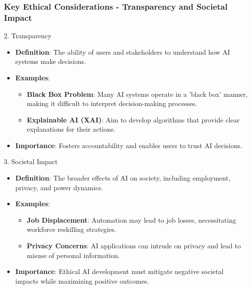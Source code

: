 \documentclass{beamer}
\begin{document}
\begin{frame}[fragile]
    \frametitle{Key Ethical Considerations - Transparency and Societal Impact}
    \begin{block}{2. Transparency}
        \begin{itemize}
            \item \textbf{Definition}: The ability of users and stakeholders to understand how AI systems make decisions.
            \item \textbf{Examples}:
            \begin{itemize}
                \item \textbf{Black Box Problem}: Many AI systems operate in a 'black box' manner, making it difficult to interpret decision-making processes.
                \item \textbf{Explainable AI (XAI)}: Aim to develop algorithms that provide clear explanations for their actions.
            \end{itemize}
            \item \textbf{Importance}: Fosters accountability and enables users to trust AI decisions.
        \end{itemize}
    \end{block}
    \begin{block}{3. Societal Impact}
        \begin{itemize}
            \item \textbf{Definition}: The broader effects of AI on society, including employment, privacy, and power dynamics.
            \item \textbf{Examples}:
            \begin{itemize}
                \item \textbf{Job Displacement}: Automation may lead to job losses, necessitating workforce reskilling strategies.
                \item \textbf{Privacy Concerns}: AI applications can intrude on privacy and lead to misuse of personal information.
            \end{itemize}
            \item \textbf{Importance}: Ethical AI development must mitigate negative societal impacts while maximizing positive outcomes.
        \end{itemize}
    \end{block}
\end{frame}
\end{document}
